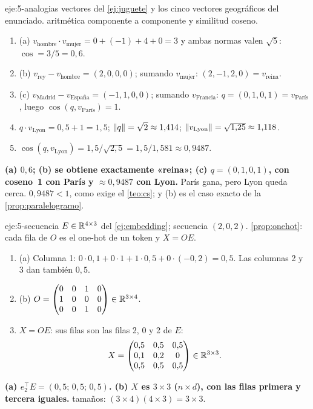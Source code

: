 \begin{solucion}{eje:5-analogias}
\datos vectores del \cref{ej:juguete} y los cinco vectores geográficos del enunciado.
\planteamiento aritmética componente a componente y similitud coseno.
\pasos
\begin{enumerate}[label=\arabic*.]
  \item (a) $v_{\text{hombre}}\cdot v_{\text{mujer}}=0+(-1)+4+0=3$ y ambas normas valen $\sqrt5$: $\cos=3/5=0{,}6$.
  \item (b) $v_{\text{rey}}-v_{\text{hombre}}=(2,0,0,0)$; sumando $v_{\text{mujer}}$: $(2,-1,2,0)=v_{\text{reina}}$.
  \item (c) $v_{\text{Madrid}}-v_{\text{España}}=(-1,1,0,0)$; sumando $v_{\text{Francia}}$: $q=(0,1,0,1)=v_{\text{París}}$, luego $\cos(q,v_{\text{París}})=1$.
  \item $q\cdot v_{\text{Lyon}}=0{,}5+1=1{,}5$; $\lVert q\rVert=\sqrt2\approx 1{,}414$; $\lVert v_{\text{Lyon}}\rVert=\sqrt{1{,}25}\approx 1{,}118$.
  \item $\cos(q,v_{\text{Lyon}})=1{,}5/\sqrt{2{,}5}=1{,}5/1{,}581\approx 0{,}9487$.
\end{enumerate}
\resultado \textbf{(a) $0{,}6$; (b) se obtiene exactamente «reina»; (c) $q=(0,1,0,1)$, con coseno~1 con París y $\approx 0{,}9487$ con Lyon.} París gana, pero Lyon queda cerca.
\comprobacion $0{,}9487<1$, como exige el \cref{teo:cs}; y (b) es el caso exacto de la \cref{prop:paralelogramo}.
\end{solucion}

\begin{solucion}{eje:5-secuencia}
\datos $E\in\mathbb{R}^{4\times 3}$ del \cref{ej:embedding}; secuencia $(2,0,2)$.
\planteamiento \cref{prop:onehot}: cada fila de $O$ es el one-hot de un token y $X=OE$.
\pasos
\begin{enumerate}[label=\arabic*.]
  \item (a) Columna 1: $0\cdot 0{,}1+0\cdot 1+1\cdot 0{,}5+0\cdot(-0{,}2)=0{,}5$. Las columnas 2 y 3 dan también $0{,}5$.
  \item (b) $O=\begin{pmatrix}0&0&1&0\\1&0&0&0\\0&0&1&0\end{pmatrix}\in\mathbb{R}^{3\times 4}$.
  \item $X=OE$: sus filas son las filas 2, 0 y 2 de $E$:
  \[
  X=\begin{pmatrix}0{,}5&0{,}5&0{,}5\\0{,}1&0{,}2&0\\0{,}5&0{,}5&0{,}5\end{pmatrix}\in\mathbb{R}^{3\times 3}.
  \]
\end{enumerate}
\resultado \textbf{(a) $e_2^{\top}E=(0{,}5;\,0{,}5;\,0{,}5)$. (b) $X$ es $3\times 3$ ($n\times d$), con las filas primera y tercera iguales.}
\comprobacion tamaños: $(3\times 4)(4\times 3)=3\times 3$.
\end{solucion}

